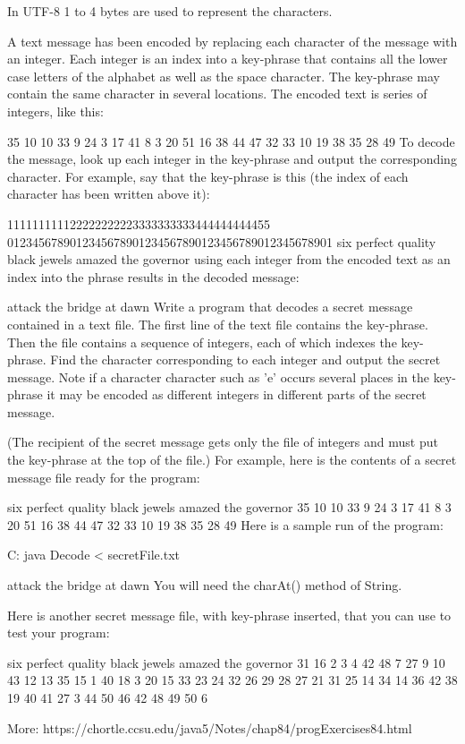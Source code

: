 In UTF-8 1 to 4 bytes are used to represent the characters.


\begin{oefening}
A text message has been encoded by replacing each character of the message with an integer. Each integer is an index into a key-phrase that contains all the lower case letters of the alphabet as well as the space character. The key-phrase may contain the same character in several locations. The encoded text is series of integers, like this:

35 10 10 33 9 24 3 17 41 8 3 20 51 16 38 44 47 32 33 10 19 38 35 28 49 
To decode the message, look up each integer in the key-phrase and output the corresponding character. For example, say that the key-phrase is this (the index of each character has been written above it):

          111111111122222222223333333333444444444455
0123456789012345678901234567890123456789012345678901 
six perfect quality black jewels amazed the governor
using each integer from the encoded text as an index into the phrase results in the decoded message:

attack the bridge at dawn
Write a program that decodes a secret message contained in a text file. The first line of the text file contains the key-phrase. Then the file contains a sequence of integers, each of which indexes the key-phrase. Find the character corresponding to each integer and output the secret message. Note if a character character such as 'e' occurs several places in the key-phrase it may be encoded as different integers in different parts of the secret message.

(The recipient of the secret message gets only the file of integers and must put the key-phrase at the top of the file.) For example, here is the contents of a secret message file ready for the program:

six perfect quality black jewels amazed the governor
35 10 10 33 9 24 3 17 41 8 3 20 51 16 38 44 47 32 33 10 19 38 35 28 49 
Here is a sample run of the program:

C:\> java Decode < secretFile.txt

attack the bridge at dawn
You will need the charAt() method of String.

Here is another secret message file, with key-phrase inserted, that you can use to test your program:

six perfect quality black jewels amazed the governor
31 16 2 3 4 42 48 7 27 9 10 43 12 13 35 15 1 40 18 3 
20 15 33 23 24 32 26 29 28 27 21 31 25 14 34 14 36 
42 38 19 40 41 27 3 44 50 46 42 48 49 50 6

More: https://chortle.ccsu.edu/java5/Notes/chap84/progExercises84.html
\end{oefening}


